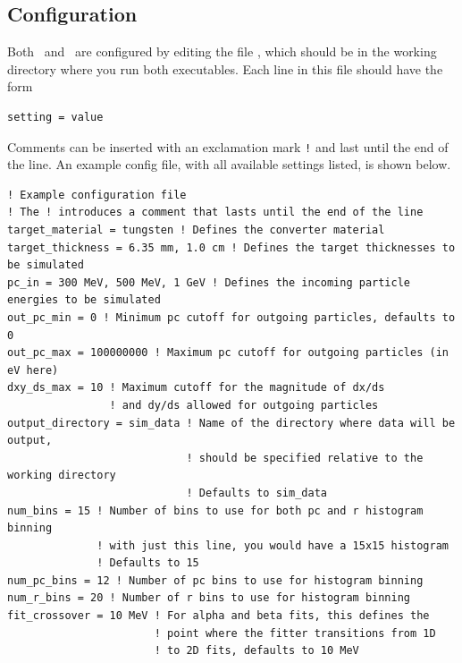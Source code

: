 \documentclass[12pt]{article}
\begin{document}
\subsection{Configuration}
Both \exes \, and \exef \, are configured by editing the file \configfile, which should be in the working directory where you run both executables.
Each line in this file should have the form
\begin{verbatim}
setting = value
\end{verbatim}
Comments can be inserted with an exclamation mark \texttt{!} and last until the end of the line.
An example config file, with all available settings listed, is shown below.
\begin{verbatim}
! Example configuration file
! The ! introduces a comment that lasts until the end of the line
target_material = tungsten ! Defines the converter material
target_thickness = 6.35 mm, 1.0 cm ! Defines the target thicknesses to be simulated
pc_in = 300 MeV, 500 MeV, 1 GeV ! Defines the incoming particle energies to be simulated
out_pc_min = 0 ! Minimum pc cutoff for outgoing particles, defaults to 0
out_pc_max = 100000000 ! Maximum pc cutoff for outgoing particles (in eV here)
dxy_ds_max = 10 ! Maximum cutoff for the magnitude of dx/ds
                ! and dy/ds allowed for outgoing particles
output_directory = sim_data ! Name of the directory where data will be output,
                            ! should be specified relative to the working directory
                            ! Defaults to sim_data
num_bins = 15 ! Number of bins to use for both pc and r histogram binning
              ! with just this line, you would have a 15x15 histogram
              ! Defaults to 15
num_pc_bins = 12 ! Number of pc bins to use for histogram binning
num_r_bins = 20 ! Number of r bins to use for histogram binning
fit_crossover = 10 MeV ! For alpha and beta fits, this defines the
                       ! point where the fitter transitions from 1D
                       ! to 2D fits, defaults to 10 MeV
\end{verbatim}
\newcommand{\targetm}{\texttt{target\_material}}
\newcommand{\targett}{\texttt{target\_thickness}}
\newcommand{\pcin}{\texttt{pc\_in}}
\newcommand{\outpcmin}{\texttt{out\_pc\_min}}
\newcommand{\outpcmax}{\texttt{out\_pc\_max}}
\newcommand{\dxydsmax}{\texttt{dxy\_ds\_max}}
\newcommand{\outdir}{\texttt{output\_directory}}
\newcommand{\numbins}{\texttt{num\_bins}}
\newcommand{\numrbins}{\texttt{num\_r\_bins}}
\newcommand{\numpcbins}{\texttt{num\_pc\_bins}}
\newcommand{\fitxpt}{\texttt{fit\_crossover}}
\end{document}
